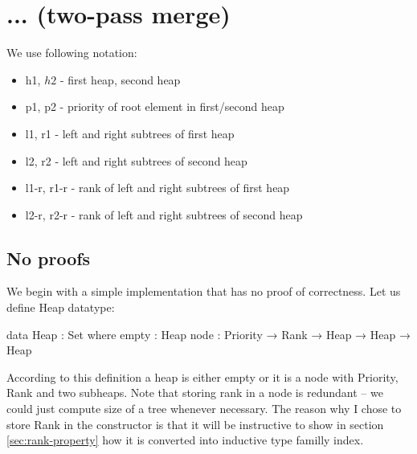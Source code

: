 \section{... (two-pass merge)}



We use following notation:

\begin{itemize}
 \item h1, $h2$ - first heap, second heap
 \item p1, p2 - priority of root element in first/second heap
 \item l1, r1 - left and right subtrees of first  heap
 \item l2, r2 - left and right subtrees of second heap
 \item l1-r, r1-r - rank of left and right subtrees of first  heap
 \item l2-r, r2-r - rank of left and right subtrees of second heap
\end{itemize}


\subsection{No proofs}

We begin with a simple implementation that has no proof of correctness. Let us define Heap datatype:

\begin{code}
data Heap : Set where
  empty : Heap
  node  : Priority → Rank → Heap → Heap → Heap
\end{code}

According to this definition a heap is either empty or it is a node with Priority, Rank and two subheaps. Note that storing rank in a node is redundant -- we could just compute size of a tree whenever necessary. The reason why I chose to store Rank in the constructor is that it will be instructive to show in section \ref{sec:rank-property} how it is converted into inductive type familly index.

